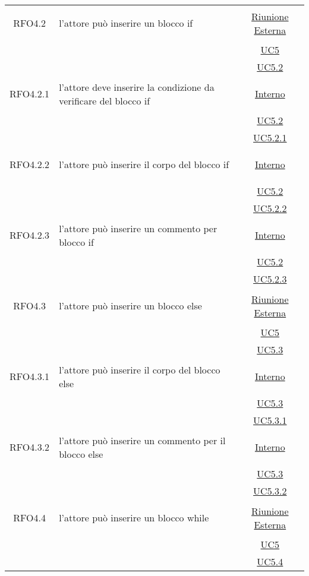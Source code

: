 \begin{longtable}{|c|>{\centering}m{7cm}|c|}
\hypertarget{RFO4.2}{RFO4.2} & l'attore può inserire un blocco if & \hyperlink{Riunione Esterna}{Riunione Esterna}\\
& &\hyperref[UC5]{UC5}\\
& &\hyperref[UC5.2]{UC5.2}\\ \hline

\hypertarget{RFO4.2.1}{RFO4.2.1} & l'attore deve inserire la condizione da verificare del blocco if & \hyperlink{Interno}{Interno}\\
& &\hyperref[UC5.2]{UC5.2}\\
& &\hyperref[UC5.2.1]{UC5.2.1}\\ \hline

\hypertarget{RFO4.2.2}{RFO4.2.2} & l'attore può inserire il corpo del blocco if & \hyperlink{Interno}{Interno}\\
& &\hyperref[UC5.2]{UC5.2}\\
& &\hyperref[UC5.2.2]{UC5.2.2}\\ \hline

\hypertarget{RFO4.2.3}{RFO4.2.3} & l'attore può inserire un commento per blocco if & \hyperlink{Interno}{Interno}\\
& &\hyperref[UC5.2]{UC5.2}\\
& &\hyperref[UC5.2.3]{UC5.2.3}\\ \hline

\hypertarget{RFO4.3}{RFO4.3} & l'attore può inserire un blocco else & \hyperlink{Riunione Esterna}{Riunione Esterna}\\
& &\hyperref[UC5]{UC5}\\
& &\hyperref[UC5.3]{UC5.3}\\ \hline

\hypertarget{RFO4.3.1}{RFO4.3.1} & l'attore può inserire il corpo del blocco else &\hyperlink{Interno}{Interno}\\
& &\hyperref[UC5.3]{UC5.3}\\
& &\hyperref[UC5.3.1]{UC5.3.1}\\ \hline

\hypertarget{RFO4.3.2}{RFO4.3.2} & l'attore può inserire un commento per il blocco else & \hyperlink{Interno}{Interno}\\
& &\hyperref[UC5.3]{UC5.3}\\
& &\hyperref[UC5.3.2]{UC5.3.2}\\ \hline

\hypertarget{RFO4.4}{RFO4.4} & l'attore può inserire un blocco while & \hyperlink{Riunione Esterna}{Riunione Esterna}\\
& &\hyperref[UC5]{UC5}\\
& &\hyperref[UC5.4]{UC5.4}\\ \hline


\end{longtable}
